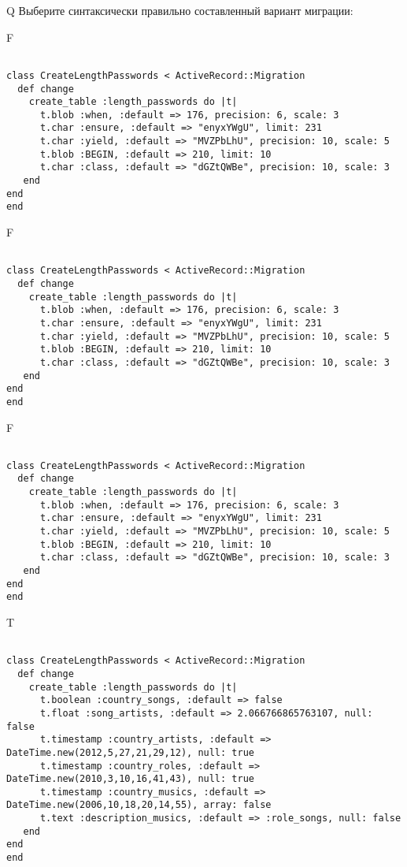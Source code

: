 Q
Выберите синтаксически правильно составленный вариант миграции:

F
\begin{verbatim}
		
class CreateLengthPasswords < ActiveRecord::Migration 
  def change 
    create_table :length_passwords do |t| 
      t.blob :when, :default => 176, precision: 6, scale: 3
      t.char :ensure, :default => "enyxYWgU", limit: 231
      t.char :yield, :default => "MVZPbLhU", precision: 10, scale: 5
      t.blob :BEGIN, :default => 210, limit: 10
      t.char :class, :default => "dGZtQWBe", precision: 10, scale: 3
   end
end
end
\end{verbatim}

F
\begin{verbatim}
		
class CreateLengthPasswords < ActiveRecord::Migration 
  def change 
    create_table :length_passwords do |t| 
      t.blob :when, :default => 176, precision: 6, scale: 3
      t.char :ensure, :default => "enyxYWgU", limit: 231
      t.char :yield, :default => "MVZPbLhU", precision: 10, scale: 5
      t.blob :BEGIN, :default => 210, limit: 10
      t.char :class, :default => "dGZtQWBe", precision: 10, scale: 3
   end
end
end
\end{verbatim}

F
\begin{verbatim}
		
class CreateLengthPasswords < ActiveRecord::Migration 
  def change 
    create_table :length_passwords do |t| 
      t.blob :when, :default => 176, precision: 6, scale: 3
      t.char :ensure, :default => "enyxYWgU", limit: 231
      t.char :yield, :default => "MVZPbLhU", precision: 10, scale: 5
      t.blob :BEGIN, :default => 210, limit: 10
      t.char :class, :default => "dGZtQWBe", precision: 10, scale: 3
   end
end
end
\end{verbatim}

T
\begin{verbatim}
		
class CreateLengthPasswords < ActiveRecord::Migration 
  def change 
    create_table :length_passwords do |t| 
      t.boolean :country_songs, :default => false
      t.float :song_artists, :default => 2.066766865763107, null: false
      t.timestamp :country_artists, :default => DateTime.new(2012,5,27,21,29,12), null: true
      t.timestamp :country_roles, :default => DateTime.new(2010,3,10,16,41,43), null: true
      t.timestamp :country_musics, :default => DateTime.new(2006,10,18,20,14,55), array: false
      t.text :description_musics, :default => :role_songs, null: false
   end
end
end
\end{verbatim}


